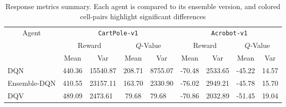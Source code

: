 \begin{table*}
\centering
\setlength{\extrarowheight}{0pt}
\addtolength{\extrarowheight}{\aboverulesep}
\addtolength{\extrarowheight}{\belowrulesep}
\setlength{\aboverulesep}{0pt}
\setlength{\belowrulesep}{0pt}
\caption{Response metrics summary. Each agent is compared to its
  ensemble version, and colored cell-pairs highlight significant
  differences}\label{table:center_results}
\begin{tabular}{lclclclcl}
\toprule
\multicolumn{1}{c}{\multirow{3}{*}{Agent}} & \multicolumn{4}{c}{\texttt{CartPole-v1}}                                                                                                                                  & \multicolumn{4}{c}{\texttt{Acrobot-v1}}                                                                      \\
\cline{2-9}
\multicolumn{1}{c}{}                       & \multicolumn{2}{c}{Reward}                                                          & \multicolumn{2}{c}{$Q$-Value}                                                       & \multicolumn{2}{c}{Reward}                           & \multicolumn{2}{c}{$Q$-Value}                         \\
\cline{2-9}
\multicolumn{1}{c}{}                       & Mean                                                      & \multicolumn{1}{c}{Var} & Mean                                                      & \multicolumn{1}{c}{Var} & Mean                       & \multicolumn{1}{c}{Var} & Mean                       & \multicolumn{1}{c}{Var}  \\
\hline
DQN                                        & {\cellcolor[rgb]{1,0.988,0.62}}440.36                     & 15540.87                & {\cellcolor[rgb]{1,0.988,0.62}}208.71                     & 8755.07                 & -70.48                     & 2533.65                 & -45.22                     & 14.57                    \\
Ensemble-DQN                               & \multicolumn{1}{l}{{\cellcolor[rgb]{1,0.988,0.62}}410.55} & 23157.11                & \multicolumn{1}{l}{{\cellcolor[rgb]{1,0.988,0.62}}163.70} & 2330.90                 & \multicolumn{1}{l}{-76.02} & 2949.21                 & \multicolumn{1}{l}{-45.78} & 15.70                    \\
DQV                                        & {\cellcolor[rgb]{1,0.988,0.62}}489.09                     & 2473.61                 & 79.68                                                     & 79.68                   & -70.86                     & 2032.89                 & -51.45                     & 19.04                    \\

\end{tabular}
\end{table*}
